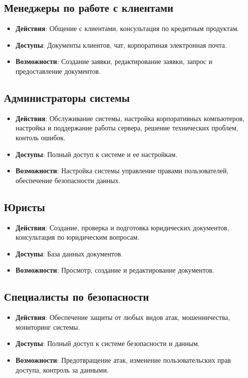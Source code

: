 \documentclass[20pt]{article}
\begin{document}
\subsection{Менеджеры по работе с клиентами}
\begin{itemize}
    \item \textbf{Действия}: Общение с клиентами, консультация по кредитным продуктам.
    \item \textbf{Доступы}: Документы клиентов, чат, корпоратиная электронная почта.
    \item \textbf{Возможности}: Создание заявки, редактирование заявки, запрос и предоставление документов.
\end{itemize}

\subsection{Администраторы системы}
\begin{itemize}
    \item \textbf{Действия}: Обслуживание системы, настройка корпоративных компьютеров, настройка и поддержание работы сервера, решение технических проблем, контоль ошибок.
    \item \textbf{Доступы}: Полный доступ к системе и ее настройкам.
    \item \textbf{Возможности}: Настройка системы управление правами пользователей, обеспечение безопасности данных.
\end{itemize}

\subsection{Юристы}
\begin{itemize}
    \item \textbf{Действия}: Создание, проверка и подготовка юридических документов, консультация по юридическим вопросам.
    \item \textbf{Доступы}: База данных документов.
    \item \textbf{Возможности}: Просмотр, создание и редактирование документов.
\end{itemize}

\subsection{Специалисты по безопасности}
\begin{itemize}
    \item \textbf{Действия}: Обеспечение защиты от любых видов атак, мошенничества, мониторинг системы.
    \item \textbf{Доступы}: Полный доступ к системе безопасности и данным.
    \item \textbf{Возможности}: Предотвращение атак, изменение пользовательских прав доступа, контроль за данными.
\end{itemize}
\end{document}
